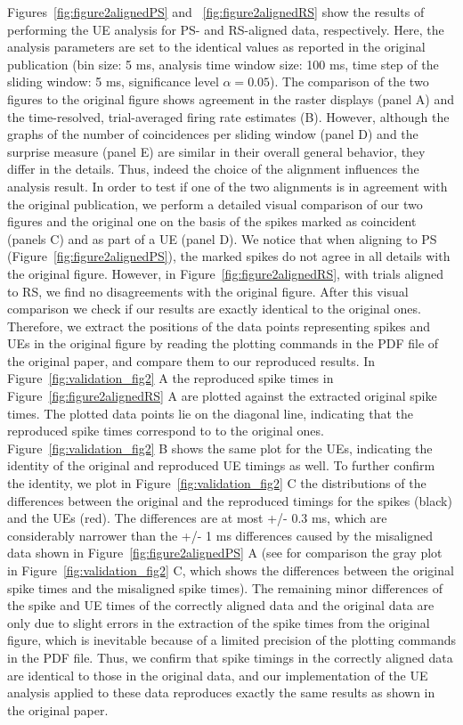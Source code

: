 \documentclass[10pt,a4paper,onecolumn]{article}
\begin{document}
Figures~\ref{fig:figure2alignedPS} and ~\ref{fig:figure2alignedRS} show
the results of performing the UE analysis for PS- and RS-aligned data,
respectively. Here, the analysis parameters are set to the identical
values as reported in the original publication (bin size: 5 ms, analysis
time window size: 100 ms, time step of the sliding window: 5 ms,
significance level \(\alpha= 0.05\)). The comparison of the two figures
to the original figure shows agreement in the raster displays (panel A)
and the time-resolved, trial-averaged firing rate estimates (B).
However, although the graphs of the number of coincidences per sliding
window (panel D) and the surprise measure (panel E) are similar in their
overall general behavior, they differ in the details. Thus, indeed the
choice of the alignment influences the analysis result. In order to test
if one of the two alignments is in agreement with the original
publication, we perform a detailed visual comparison of our two figures
and the original one on the basis of the spikes marked as coincident
(panels C) and as part of a UE (panel D). We notice that when aligning
to PS (Figure~\ref{fig:figure2alignedPS}), the marked spikes do not
agree in all details with the original figure. However, in
Figure~\ref{fig:figure2alignedRS}, with trials aligned to RS, we find no
disagreements with the original figure. After this visual comparison we
check if our results are exactly identical to the original ones.
Therefore, we extract the positions of the data points representing
spikes and UEs in the original figure by reading the plotting commands
in the PDF file of the original paper, and compare them to our
reproduced results. In Figure~\ref{fig:validation_fig2} A the reproduced
spike times in Figure~\ref{fig:figure2alignedRS} A are plotted against
the extracted original spike times. The plotted data points lie on the
diagonal line, indicating that the reproduced spike times correspond to
to the original ones. Figure~\ref{fig:validation_fig2} B shows the same
plot for the UEs, indicating the identity of the original and reproduced
UE timings as well. To further confirm the identity, we plot in
Figure~\ref{fig:validation_fig2} C the distributions of the differences
between the original and the reproduced timings for the spikes (black)
and the UEs (red). The differences are at most +/- 0.3 ms, which are
considerably narrower than the +/- 1 ms differences caused by the
misaligned data shown in Figure~\ref{fig:figure2alignedPS} A (see for
comparison the gray plot in Figure~\ref{fig:validation_fig2} C, which
shows the differences between the original spike times and the
misaligned spike times). The remaining minor differences of the spike
and UE times of the correctly aligned data and the original data are
only due to slight errors in the extraction of the spike times from the
original figure, which is inevitable because of a limited precision of
the plotting commands in the PDF file. Thus, we confirm that spike
timings in the correctly aligned data are identical to those in the
original data, and our implementation of the UE analysis applied to
these data reproduces exactly the same results as shown in the original
paper.
\end{document}
